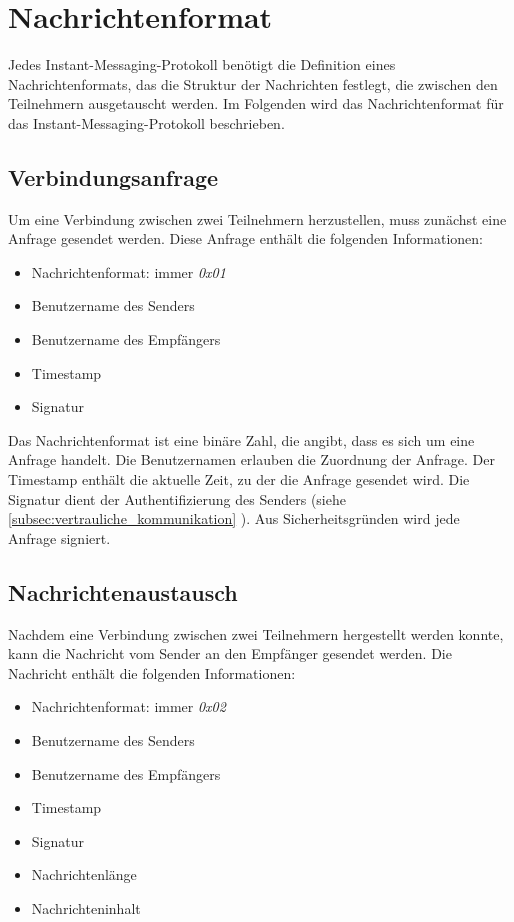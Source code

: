 \section{Nachrichtenformat}
\label{sec:nachrichtenformat}

Jedes Instant-Messaging-Protokoll benötigt die Definition eines Nachrichtenformats, das die Struktur der Nachrichten festlegt, die zwischen den Teilnehmern ausgetauscht werden. Im Folgenden wird das Nachrichtenformat für das Instant-Messaging-Protokoll beschrieben.

\subsection{Verbindungsanfrage}
Um eine Verbindung zwischen zwei Teilnehmern herzustellen, muss zunächst eine Anfrage gesendet werden. Diese Anfrage enthält die folgenden Informationen:

\begin{itemize}
    \item Nachrichtenformat: immer \textit{0x01}
    \item Benutzername des Senders
    \item Benutzername des Empfängers
    \item Timestamp
    \item Signatur
\end{itemize}

\noindent Das Nachrichtenformat ist eine binäre Zahl, die angibt, dass es sich um eine Anfrage handelt. Die Benutzernamen erlauben die Zuordnung der Anfrage. Der Timestamp enthält die aktuelle Zeit, zu der die Anfrage gesendet wird. Die Signatur dient der Authentifizierung des Senders (siehe \ref{subsec:vertrauliche_kommunikation} \textit{}). Aus Sicherheitsgründen wird jede Anfrage signiert.


\subsection{Nachrichtenaustausch}
Nachdem eine Verbindung zwischen zwei Teilnehmern hergestellt werden konnte, kann die Nachricht vom Sender an den Empfänger gesendet werden. Die Nachricht enthält die folgenden Informationen:

\begin{itemize}
    \item Nachrichtenformat: immer \textit{0x02}
    \item Benutzername des Senders
    \item Benutzername des Empfängers
    \item Timestamp
    \item Signatur
    \item Nachrichtenlänge
    \item Nachrichteninhalt
\end{itemize}

